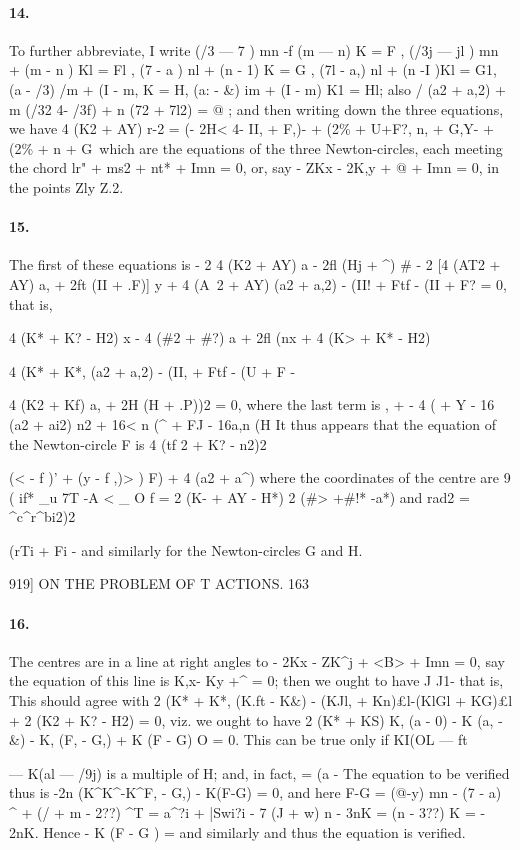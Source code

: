 \documentclass[11pt,a4paper]{book}
\begin{document}
{{{{{\paragraph{14.} To  further  abbreviate,  I  write
(/3  ---  7  )  mn  -f  (m  ---  n)  K  =  F  ,     (/3j  ---  jl  )  mn  +  (m  -  n  )  Kl  =  Fl  ,
(7  -  a  )  nl  +  (n  -  1)  K  =  G  ,     (7l  -  a,)  nl    +  (n  -I  )Kl  =  G1,
(a  -  /3)  /m  +  (I    -  m,  K  =  H,     (a:  -  \&)  im  +  (I   -  m)  K1  =  Hl;
also
/  (a2  +  a,2)  +  m  (/32  4-  /3f)  +  n  (72  +  7l2)  =  @  ;
and  then  writing  down  the  three  equations,  we  have
4  (K2  +  AY)  r-2  =  (-  2H<   4-  II,  +  F,)-  +  (2\%  +  U+F?,
n,  +  G,Y-  +  (2\%  +  n  +  G\
which  are  the  equations  of  the  three  Newton-circles,  each  meeting  the  chord
lr"  +  ms2  +  nt*  +  Imn  =  0,
or,  say
-  ZKx  -  2K,y  +  @  +  Imn  =  0,
in  the  points  Zly  Z.2.


\paragraph{15.} The  first  of  these  equations  is
-  2  {4  (K2  +  AY)  a  -  2fl  (Hj  +  ^)}  \#
-  2  [4  (AT2  +  AY)  a,  +  2ft  (II  +  .F)]  y
+  4  (A~2  +  AY)  (a2  +  a,2)  -  (II!  +  Ftf  -  (II  +  F?  =  0,
that  is,
{4  (K*  +  K?  -  H2)  x  -  4  (\#2  +  \#?)  a  +  2fl  (nx
+    4  (K>  +  K*  -  H2)  {4  (K*  +  K*,  (a2  +  a,2)  -  (II,  +  Ftf  -  (U  +  F
-  {4  (K2  +  Kf)  a,  +  2H  (H  +  .P))2  =  0,
where  the  last  term  is
,  +         -  4  (     +     Y
-  16  (a2  +  ai2)  n2  +  16< n  (^  +  FJ  -  16a,n  (H
It  thus  appears  that  the  equation  of  the  Newton-circle  F  is
4  (tf  2  +  K?  -  n2)2  {(<   -  f  )'  +  (y  -  f  ,)> )
F)  +  4  (a2  +  a^)
where  the  coordinates  of  the  centre  are
9  ( if*  \_u  7T  -A  <   \_  O
f  =   
2  (K-  +  AY  -  H*)
2  (\#> +\#!* -a*)
and
rad2  =  ^c^r^bi2)2  {(rTi + Fi  -
and  similarly  for  the  Newton-circles  G  and  H.


919]  ON    THE    PROBLEM    OF    T  ACTIONS.  163
\paragraph{16.} The  centres  are  in  a  line  at  right  angles  to
-  2Kx  -  ZK^j  +  <B>  +  Imn  =  0,
say  the  equation  of  this  line  is
K,x-    Ky  +^  =  0;
then  we  ought  to  have
J       J1-
that  is,
This  should  agree  with
2  (K*  +  K*,  (K.ft  -  K\&)  -  (KJl,  +  Kn)£l-(KlGl  +  KG)£l  +  2  (K2  +  K?  -  H2)  \yen  =  0,
viz.  we  ought  to  have
2  (K*  +  KS)  {K,  (a  -  0)  -  K  (a,  -  \&)}  -  {K,  (F,  -  G,)  +  K  (F  -  G)}  O  =  0.
This  can  be  true  only  if  KI(OL  ---  ft}  ---  K(al  ---  /9j)  is  a  multiple  of  H;   and,  in  fact,
=  (a  -
The  equation  to  be  verified  thus  is
-2n  (K^K^-K^F,  -  G,)  -  K(F-G)  =  0,
and  here
F-G  =  (@-y)  mn  -  (7  -  a)  ^  +  (/  +  m  -  2??)  ^T
=  a^?i  +  |Swi?i  -  7  (J  +  w)  n  -  3nK  =  (n  -  3??)  K  =  -  2nK.
Hence
-  K  (F  -  G  )  =
and  similarly
and  thus  the  equation  is  verified.
}}}}}}}}}
\end{document}
